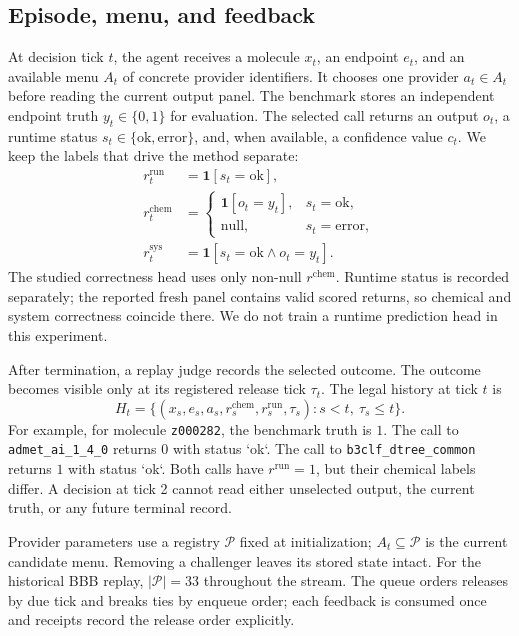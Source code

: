 \documentclass[sigconf,anonymous]{aamas}
\begin{document}
\subsection{Episode, menu, and feedback}
At decision tick $t$, the agent receives a molecule $x_t$, an endpoint $e_t$, and an available menu $A_t$ of concrete provider identifiers. It chooses one provider $a_t\in A_t$ before reading the current output panel. The benchmark stores an independent endpoint truth $y_t\in\{0,1\}$ for evaluation. The selected call returns an output $o_t$, a runtime status $s_t\in\{\mathrm{ok},\mathrm{error}\}$, and, when available, a confidence value $c_t$. We keep the labels that drive the method separate:
$$
\begin{aligned}
 r_t^{\mathrm{run}}&=\mathbf{1}[s_t=\mathrm{ok}],\\
 r_t^{\mathrm{chem}}&=\begin{cases}\mathbf{1}[o_t=y_t],&s_t=\mathrm{ok},\\ \mathrm{null},&s_t=\mathrm{error},\end{cases}\\
 r_t^{\mathrm{sys}}&=\mathbf{1}[s_t=\mathrm{ok}\land o_t=y_t].
\end{aligned}
$$
The studied correctness head uses only non-null $r^{\mathrm{chem}}$. Runtime status is recorded separately; the reported fresh panel contains valid scored returns, so chemical and system correctness coincide there. We do not train a runtime prediction head in this experiment.

After termination, a replay judge records the selected outcome. The outcome becomes visible only at its registered release tick $\tau_t$. The legal history at tick $t$ is
$$
H_t=\{(x_s,e_s,a_s,r_s^{\mathrm{chem}},r_s^{\mathrm{run}},\tau_s):s<t,\ \tau_s\leq t\}.
$$
For example, for molecule \texttt{z000282}, the benchmark truth is $1$. The call to \texttt{admet\_ai\_1\_4\_0} returns $0$ with status `ok`. The call to \texttt{b3clf\_dtree\_common} returns $1$ with status `ok`. Both calls have $r^{\mathrm{run}}=1$, but their chemical labels differ. A decision at tick 2 cannot read either unselected output, the current truth, or any future terminal record.

Provider parameters use a registry $\mathcal P$ fixed at initialization; $A_t\subseteq\mathcal P$ is the current candidate menu. Removing a challenger leaves its stored state intact. For the historical BBB replay, $|\mathcal P|=33$ throughout the stream. The queue orders releases by due tick and breaks ties by enqueue order; each feedback is consumed once and receipts record the release order explicitly.
\end{document}

